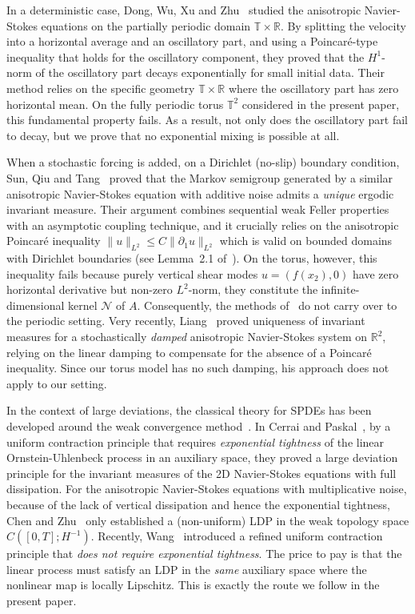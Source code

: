\documentclass[11pt,a4paper,reqno]{amsart}
\theoremstyle{definition}
\begin{document}
In a deterministic case, Dong, Wu, Xu and Zhu~\cite{DongWuXuZhu2021}
studied the anisotropic Navier-Stokes equations on the partially periodic
domain $\mathbb{T}\times\mathbb{R}$.  By splitting the velocity into a
horizontal average and an oscillatory part, and using a Poincar\'{e}-type
inequality that holds for the oscillatory component,
they proved that the $H^1$-norm of the oscillatory
part decays exponentially for small initial data. Their method relies on the specific geometry $\mathbb{T}\times\mathbb{R}$
where the oscillatory part has zero horizontal mean.
On the fully periodic torus $\mathbb{T}^2$ considered in the present paper,
this fundamental property fails.  As a result, not only does the
oscillatory part fail to decay, but we prove that no exponential
mixing is possible at all.

When a stochastic forcing is added,  on a Dirichlet (no-slip) boundary condition,
Sun, Qiu and Tang~\cite{SPL} proved that the Markov semigroup generated by a
similar anisotropic Navier-Stokes equation with additive noise admits a
\emph{unique} ergodic invariant measure.  Their argument combines sequential
weak Feller properties with an asymptotic coupling technique, and it crucially
relies on the anisotropic Poincar\'{e} inequality
$\|u\|_{L^2}\le C\|\partial_1 u\|_{L^2}$ which is valid on bounded domains with
Dirichlet boundaries (see Lemma~2.1 of~\cite{SPL}).  On the torus,
however, this inequality fails because purely vertical shear modes
$u=(f(x_2),0)$ have zero horizontal derivative but non-zero $L^2$-norm, they
constitute the infinite-dimensional kernel $\mathcal N$ of $A$.  Consequently,
the methods of~\cite{SPL} do not carry over to the periodic setting.
Very recently, Liang~\cite{Liang2026} proved uniqueness of invariant measures
for a stochastically \emph{damped} anisotropic Navier-Stokes system on
$\mathbb{R}^2$, relying on the linear damping to compensate for the absence of
a Poincar\'{e} inequality.  Since our torus model has no such damping, his
approach does not apply to our setting.



In the context of large deviations, the classical theory for SPDEs has been
developed around the weak convergence method~\cite{BD,BDM}. In
Cerrai and Paskal~\cite{CP}, by a uniform contraction principle that requires \emph{exponential tightness}
of the linear Ornstein-Uhlenbeck process in an auxiliary space, they  proved a large deviation principle for
the invariant measures of the 2D Navier-Stokes equations with full dissipation.
For the anisotropic Navier-Stokes equations with multiplicative noise, because of the lack of vertical dissipation
and hence the exponential tightness,
Chen and Zhu~\cite{ChenZhu} only established a (non-uniform) LDP in the weak topology space
$C([0,T];H^{-1})$.  Recently, Wang~\cite{Wang2023} introduced a refined uniform contraction principle
that \emph{does not require exponential tightness}.  The price to pay is that the
linear process must satisfy an LDP in the \emph{same} auxiliary space where the
nonlinear map is locally Lipschitz.  This is exactly the route we follow in the
present paper.
\end{document}
